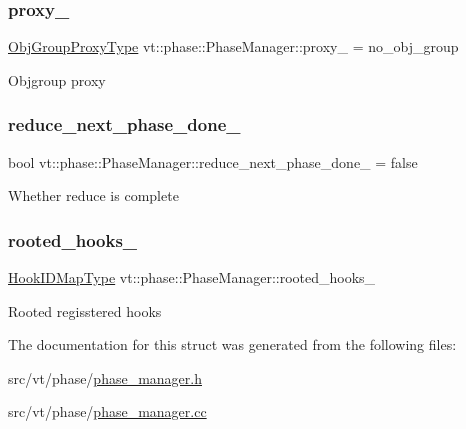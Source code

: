 \subsubsection{\texorpdfstring{proxy\+\_\+}{proxy\_}}
{\footnotesize\ttfamily \hyperlink{namespacevt_ad7cae989df485fccca57f0792a880a8e}{Obj\+Group\+Proxy\+Type} vt\+::phase\+::\+Phase\+Manager\+::proxy\+\_\+ = no\+\_\+obj\+\_\+group\hspace{0.3cm}{\ttfamily [private]}}

Objgroup proxy \mbox{\label{structvt_1_1phase_1_1_phase_manager_a28428326d10fe9485d3da07e8650d352}} 
\subsubsection{\texorpdfstring{reduce\+\_\+next\+\_\+phase\+\_\+done\+\_\+}{reduce\_next\_phase\_done\_}}
{\footnotesize\ttfamily bool vt\+::phase\+::\+Phase\+Manager\+::reduce\+\_\+next\+\_\+phase\+\_\+done\+\_\+ = false\hspace{0.3cm}{\ttfamily [private]}}

Whether reduce is complete \mbox{\label{structvt_1_1phase_1_1_phase_manager_a6a2b1be3c11f4fc91bfb84cc2c47c545}} 
\subsubsection{\texorpdfstring{rooted\+\_\+hooks\+\_\+}{rooted\_hooks\_}}
{\footnotesize\ttfamily \hyperlink{structvt_1_1phase_1_1_phase_manager_a7f9784fa7550beaa1e7d59e639169a8b}{Hook\+I\+D\+Map\+Type} vt\+::phase\+::\+Phase\+Manager\+::rooted\+\_\+hooks\+\_\+\hspace{0.3cm}{\ttfamily [private]}}

Rooted regisstered hooks 

The documentation for this struct was generated from the following files\+:\begin{DoxyCompactItemize}
\item 
src/vt/phase/\hyperlink{phase__manager_8h}{phase\+\_\+manager.\+h}\item 
src/vt/phase/\hyperlink{phase__manager_8cc}{phase\+\_\+manager.\+cc}\end{DoxyCompactItemize}
